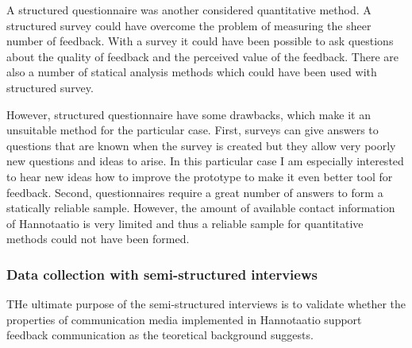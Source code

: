 \documentclass[english,12pt,a4paper,pdftex]{article}
\begin{document}
A structured questionnaire was another considered quantitative method. A structured survey could have overcome the problem of measuring the sheer number of feedback. With a survey it could have been possible to ask questions about the quality of feedback and the perceived value of the feedback. There are also a number of statical analysis methods which could have been used with structured survey.

However, structured questionnaire have some drawbacks, which make it an unsuitable method for the particular case. First, surveys can give answers to questions that are known when the survey is created but they allow very poorly new questions and ideas to arise. In this particular case I am especially interested to hear new ideas how to improve the prototype to make it even better tool for feedback. Second, questionnaires require a great number of answers to form a statically reliable sample. However, the amount of available contact information of Hannotaatio is very limited and thus a reliable sample for quantitative methods could not have been formed.

\subsubsection{Data collection with semi-structured interviews}

THe ultimate purpose of the semi-structured interviews is to validate whether the properties of communication media implemented in Hannotaatio support feedback communication as the teoretical background suggests. 

\citep{silverman2009doing}

\end{document}
